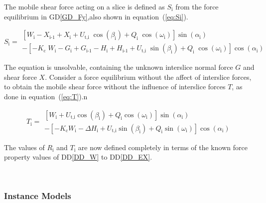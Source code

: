 \documentclass[12pt]{article}
\newcommand{\ddref}[1]{DD\ref{#1}}
\newcommand{\dref}[1]{GD\ref{#1}}
\begin{document}
\noindent
The mobile shear force acting on a slice is defined as $S_\text{i}$
from the force equilibrium in \dref{GD_Fy},also shown in
equation~(\ref{eq:Si}).

\begin{equation}  \label{eq:Si}
  S_{\text{i}} = \begin{array}{l} \left[ W_{\text{i}} -X_{\text{i-1}}
      + X_{\text{i}} +
      {U_{\text{t,i}}}\;{\cos\left(\beta_{\text{i}}\right)} +
      Q_{\text{i}}\;{\cos\left(\omega_{\text{i}}\right)}
      \right]\sin\left(\alpha_{\text{i}}\right) \\ - \left[
      {-K_{\text{c}}}\;{W_{\text{i}}} - G_{\text{i}} + G_{\text{i-1}}
      - H_{\text{i}} + H_{\text{i-1}} +
      {U_{\text{t,i}}}\;{\sin\left(\beta_{\text{i}}\right)} +
      Q_{\text{i}}\;{\cos\left(\omega_{\text{i}}\right)}
      \right]\cos\left(\alpha_{\text{i}}\right) \end{array}
\end{equation}

\noindent
The equation is unsolvable, containing the unknown interslice normal
force $G$ and shear force $X$.  Consider a force equilibrium without
the affect of interslice forces, to obtain the mobile shear force
without the influence of interslice forces $T$, as done in
equation~(\ref{eq:T}).n

\begin{equation}  \label{eq:T} T_{\text{i}} =
  \begin{array}{l}  
\left[ W_{\text{i}} + U_{\text{t,i}} \cos\left(\beta_{\text{i}}\right)
  + Q_{\text{i}} \cos\left(\omega_{\text{i}}\right) \right]
\sin\left(\alpha_{\text{i}}\right) \\ - \left[ - K_{\text{c}}
  W_{\text{i}} - \Delta H_{\text{i}} + U_{\text{t,i}}
  \sin\left(\beta_{\text{i}}\right) + Q_{\text{i}}
  \sin\left(\omega_{\text{i}}\right) \right]
\cos\left(\alpha_{\text{i}}\right) \end{array}
\end{equation}

\noindent
The values of $R_\text{i}$ and $T_\text{i}$ are now defined completely
in terms of the known force property values of \ddref{DD_W} to
\ddref{DD_EX}.

~\newline

\subsubsection{Instance Models} \label{sec_instance}
\end{document}
